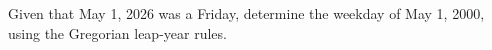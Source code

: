 Given that May 1, 2026 was a Friday, determine the weekday of May 1, 2000, using the Gregorian leap-year rules.
